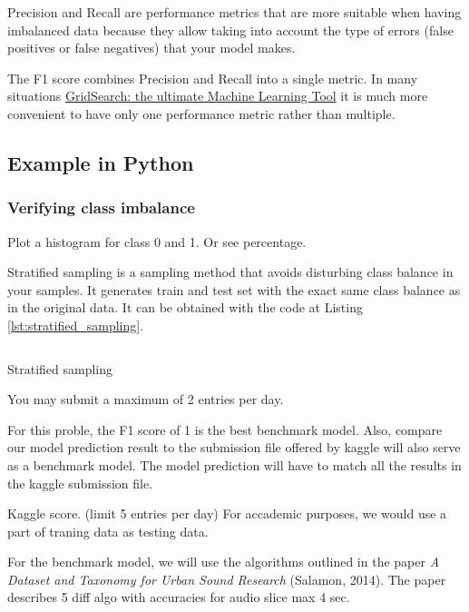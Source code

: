 Precision and Recall are performance metrics that are more suitable when
having imbalanced data because they allow taking into account the type
of errors (false positives or false negatives) that your model makes.

The F1 score combines Precision and Recall into a single metric. In many
situations
\href{https://towardsdatascience.com/gridsearch-the-ultimate-machine-learning-tool-6cd5fb93d07}{GridSearch:
the ultimate Machine Learning Tool} it is much more convenient to have
only one performance metric rather than multiple.

\hypertarget{example-in-python}{%
\subsection{Example in Python}\label{example-in-python}}

\hypertarget{verifying-class-imbalance}{%
\subsubsection{Verifying class
imbalance}\label{verifying-class-imbalance}}

Plot a histogram for class 0 and 1. Or see percentage.

Stratified sampling is a sampling method that avoids disturbing class
balance in your samples. It generates train and test set with the exact
same class balance as in the original data. It can be obtained with the
code at Listing \ref{lst:stratified_sampling}.

\begin{listing}[htp]
  \inputminted{python}{code/stratified_train_test.py}
  \caption{Stratified sampling}
  \label{lst:stratified_sampling}
\end{listing}

You may submit a maximum of 2 entries per day.

For this proble, the F1 score of 1 is the best benchmark model. Also,
compare our model prediction result to the submission file offered by
kaggle will also serve as a benchmark model. The model prediction will
have to match all the results in the kaggle submission file.

Kaggle score. (limit 5 entries per day) For accademic purposes, we would
use a part of traning data as testing data.

For the benchmark model, we will use the algorithms outlined in the
paper \emph{A Dataset and Taxonomy for Urban Sound Research} (Salamon,
2014). The paper describes 5 diff algo with accuracies for audio slice
max 4 sec.

